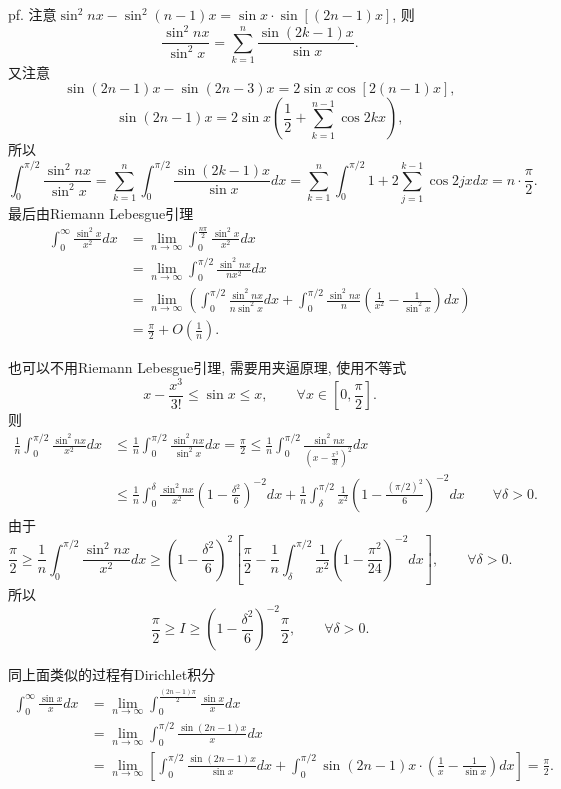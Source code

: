 pf. 注意$\sin^{2}nx-\sin^{2}(n-1)x=\sin x\cdot\sin\left[(2n-1)x\right]$,
则
\[
\frac{\sin^{2}nx}{\sin^{2}x}=\sum_{k=1}^{n}\frac{\sin(2k-1)x}{\sin x}.
\]
又注意
\[
\sin(2n-1)x-\sin(2n-3)x=2\sin x\cos\left[2(n-1)x\right],
\]
\[
\sin(2n-1)x=2\sin x\left(\frac{1}{2}+\sum_{k=1}^{n-1}\cos2kx\right),
\]
所以
\[
\int_{0}^{\pi/2}\frac{\sin^{2}nx}{\sin^{2}x}=\sum_{k=1}^{n}\int_{0}^{\pi/2}\frac{\sin(2k-1)x}{\sin x}dx=\sum_{k=1}^{n}\int_{0}^{\pi/2}1+2\sum_{j=1}^{k-1}\cos2jxdx=n\cdot\frac{\pi}{2}.
\]
最后由Riemann Lebesgue引理
\begin{align*}
\int_{0}^{\infty}\frac{\sin^{2}x}{x^{2}}dx & =\lim_{n\to\infty}\int_{0}^{\frac{n\pi}{2}}\frac{\sin^{2}x}{x^{2}}dx\\
 & =\lim_{n\to\infty}\int_{0}^{\pi/2}\frac{\sin^{2}nx}{nx^{2}}dx\\
 & =\lim_{n\to\infty}\left(\int_{0}^{\pi/2}\frac{\sin^{2}nx}{n\sin^{2}x}dx+\int_{0}^{\pi/2}\frac{\sin^{2}nx}{n}\left(\frac{1}{x^{2}}-\frac{1}{\sin^{2}x}\right)dx\right)\\
 & =\frac{\pi}{2}+O\left(\frac{1}{n}\right).
\end{align*}

也可以不用Riemann Lebesgue引理, 需要用夹逼原理, 使用不等式
\[
x-\frac{x^{3}}{3!}\le\sin x\le x,\qquad\forall x\in\left[0,\frac{\pi}{2}\right].
\]
则
\begin{align*}
\frac{1}{n}\int_{0}^{\pi/2}\frac{\sin^{2}nx}{x^{2}}dx & \le\frac{1}{n}\int_{0}^{\pi/2}\frac{\sin^{2}nx}{\sin^{2}x}dx=\frac{\pi}{2}\le\frac{1}{n}\int_{0}^{\pi/2}\frac{\sin^{2}nx}{\left(x-\frac{x^{3}}{3!}\right)^{2}}dx\\
 & \le\frac{1}{n}\int_{0}^{\delta}\frac{\sin^{2}nx}{x^{2}}\left(1-\frac{\delta^{2}}{6}\right)^{-2}dx+\frac{1}{n}\int_{\delta}^{\pi/2}\frac{1}{x^{2}}\left(1-\frac{(\pi/2)^{2}}{6}\right)^{-2}dx\qquad\forall\delta>0.
\end{align*}
由于
\[
\frac{\pi}{2}\ge\frac{1}{n}\int_{0}^{\pi/2}\frac{\sin^{2}nx}{x^{2}}dx\ge\left(1-\frac{\delta^{2}}{6}\right)^{2}\left[\frac{\pi}{2}-\frac{1}{n}\int_{\delta}^{\pi/2}\frac{1}{x^{2}}\left(1-\frac{\pi^{2}}{24}\right)^{-2}dx\right],\qquad\forall\delta>0.
\]
所以
\[
\frac{\pi}{2}\ge I\ge\left(1-\frac{\delta^{2}}{6}\right)^{-2}\frac{\pi}{2},\qquad\forall\delta>0.
\]

同上面类似的过程有Dirichlet积分
\begin{align*}
\int_{0}^{\infty}\frac{\sin x}{x}dx & =\lim_{n\to\infty}\int_{0}^{\frac{(2n-1)\pi}{2}}\frac{\sin x}{x}dx\\
 & =\lim_{n\to\infty}\int_{0}^{\pi/2}\frac{\sin(2n-1)x}{x}dx\\
 & =\lim_{n\to\infty}\left[\int_{0}^{\pi/2}\frac{\sin(2n-1)x}{\sin x}dx+\int_{0}^{\pi/2}\sin(2n-1)x\cdot\left(\frac{1}{x}-\frac{1}{\sin x}\right)dx\right]=\frac{\pi}{2}.
\end{align*}


